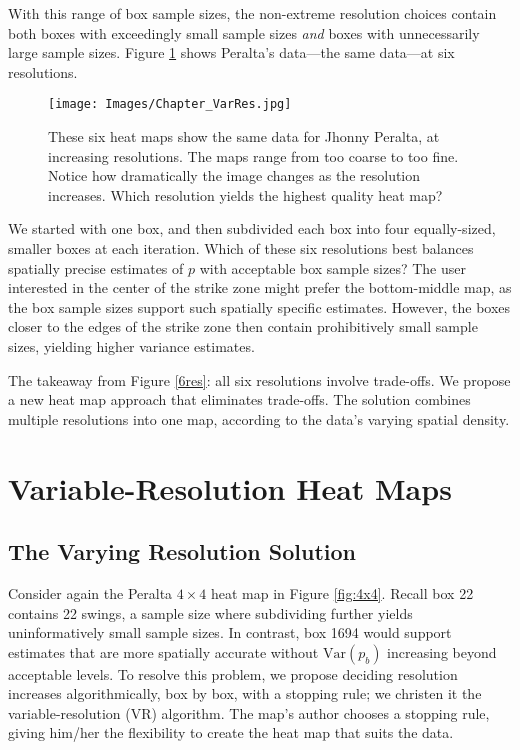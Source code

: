 With this range of box sample sizes, the non-extreme resolution choices contain both boxes with exceedingly small sample sizes {\it and} boxes with unnecessarily large sample sizes. Figure \ref{fig:6res} shows Peralta's data---the same data---at six resolutions. 
        \begin{figure}[H]
      	\centering
      	\texttt{[image: Images/Chapter\_VarRes.jpg]} 
      	\caption{These six heat maps show the same data for Jhonny Peralta, at increasing resolutions. The maps range from too coarse to too fine. Notice how dramatically the image changes as the resolution increases. Which resolution yields the highest quality heat map?}
      	\label{fig:6res}
      	\end{figure} 
We started with one box, and then subdivided each box into four equally-sized, smaller boxes at each iteration. Which of these six resolutions best balances spatially precise estimates of $p$ with acceptable box sample sizes? The user interested in the center of the strike zone might prefer the bottom-middle map, as the box sample sizes support such spatially specific estimates. However, the boxes closer to the edges of the strike zone then contain prohibitively small sample sizes, yielding higher variance estimates. 

The takeaway from Figure \ref{6res}: all six resolutions involve trade-offs. We propose a new heat map approach that eliminates trade-offs. The solution combines multiple resolutions into one map, according to the data's varying spatial density.

\section{Variable-Resolution Heat Maps} \label{VRHM}

\subsection{The Varying Resolution Solution}

Consider again the Peralta $4 \times 4$ heat map in Figure \ref{fig:4x4}. Recall box 22 contains 22 swings, a sample size where subdividing further yields uninformatively small sample sizes. In contrast, box 1694 would support estimates that are more spatially accurate without $\text{Var}(p_{b})$ increasing beyond acceptable levels. To resolve this problem, we propose deciding resolution increases algorithmically, box by box, with a stopping rule; we christen it the variable-resolution (VR) algorithm. The map's author chooses a stopping rule, giving him/her the flexibility to create the heat map that suits the data. 


